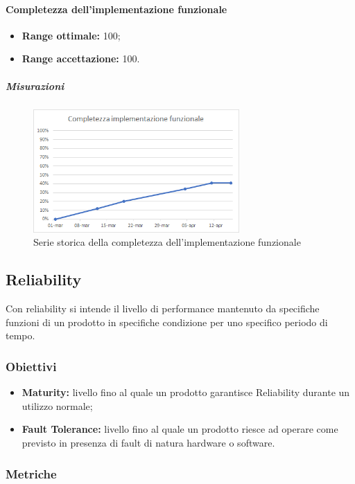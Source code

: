 			\paragraph{Completezza dell'implementazione funzionale}\Spazio
			\begin{itemize}
				\item {\textbf{Range ottimale:} 100;}
				\item {\textbf{Range accettazione:} 100.}
			\end{itemize} 
            \subparagraph{Misurazioni}
            \begin{figure}[H]
            	\centering 
            	\includegraphics[width=0.7\textwidth]{images/completezza-funzionale.png}
            	\caption{Serie storica della completezza dell'implementazione funzionale}
            	\label{cf} 
            \end{figure}
	\subsection{Reliability}
		Con reliability si intende il livello di performance mantenuto da specifiche funzioni di un prodotto in specifiche condizione per uno specifico periodo di tempo.
		\subsubsection{Obiettivi}
		\begin{itemize}
			\item {\textbf{Maturity:} livello fino al quale un prodotto garantisce Reliability durante un utilizzo normale;}
			\item {\textbf{Fault Tolerance:} livello fino al quale un prodotto riesce ad operare come previsto in presenza di fault di natura hardware o software.}
		\end{itemize}
		\subsubsection{Metriche}
